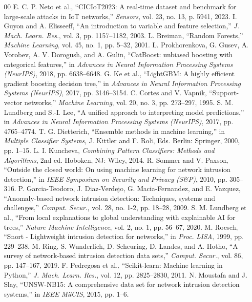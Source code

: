 \documentclass[conference]{IEEEtran}
\begin{document}
\begin{thebibliography}{00}
 E. C. P. Neto et al., ``CICIoT2023: A real-time dataset and benchmark for large-scale attacks in IoT networks,'' \textit{Sensors}, vol. 23, no. 13, p. 5941, 2023.
 I. Guyon and A. Elisseeff, ``An introduction to variable and feature selection,'' \textit{J. Mach. Learn. Res.}, vol. 3, pp. 1157--1182, 2003.
 L. Breiman, ``Random Forests,'' \textit{Machine Learning}, vol. 45, no. 1, pp. 5--32, 2001.
 L. Prokhorenkova, G. Gusev, A. Vorobev, A. V. Dorogush, and A. Gulin, ``CatBoost: unbiased boosting with categorical features,'' in \textit{Advances in Neural Information Processing Systems (NeurIPS)}, 2018, pp. 6638--6648.
 G. Ke et al., ``LightGBM: A highly efficient gradient boosting decision tree,'' in \textit{Advances in Neural Information Processing Systems (NeurIPS)}, 2017, pp. 3146--3154.
 C. Cortes and V. Vapnik, ``Support-vector networks,'' \textit{Machine Learning}, vol. 20, no. 3, pp. 273--297, 1995.
 S. M. Lundberg and S.-I. Lee, ``A unified approach to interpreting model predictions,'' in \textit{Advances in Neural Information Processing Systems (NeurIPS)}, 2017, pp. 4765--4774.
 T. G. Dietterich, ``Ensemble methods in machine learning,'' in \textit{Multiple Classifier Systems}, J. Kittler and F. Roli, Eds. Berlin: Springer, 2000, pp. 1--15.
 L. I. Kuncheva, \textit{Combining Pattern Classifiers: Methods and Algorithms}, 2nd ed. Hoboken, NJ: Wiley, 2014.
 R. Sommer and V. Paxson, ``Outside the closed world: On using machine learning for network intrusion detection,'' in \textit{IEEE Symposium on Security and Privacy (S\&P)}, 2010, pp. 305--316.
 P. Garcia-Teodoro, J. Diaz-Verdejo, G. Macia-Fernandez, and E. Vazquez, ``Anomaly-based network intrusion detection: Techniques, systems and challenges,'' \textit{Comput. Secur.}, vol. 28, no. 1-2, pp. 18--28, 2009.
 S. M. Lundberg et al., ``From local explanations to global understanding with explainable AI for trees,'' \textit{Nature Machine Intelligence}, vol. 2, no. 1, pp. 56--67, 2020.
 M. Roesch, ``Snort - Lightweight intrusion detection for networks,'' in \textit{Proc. LISA}, 1999, pp. 229--238.
 M. Ring, S. Wunderlich, D. Scheuring, D. Landes, and A. Hotho, ``A survey of network-based intrusion detection data sets,'' \textit{Comput. Secur.}, vol. 86, pp. 147--167, 2019.
 F. Pedregosa et al., ``Scikit-learn: Machine learning in Python,'' \textit{J. Mach. Learn. Res.}, vol. 12, pp. 2825--2830, 2011.
 N. Moustafa and J. Slay, ``UNSW-NB15: A comprehensive data set for network intrusion detection systems,'' in \textit{IEEE MilCIS}, 2015, pp. 1--6.
\end{thebibliography}
\end{document}
